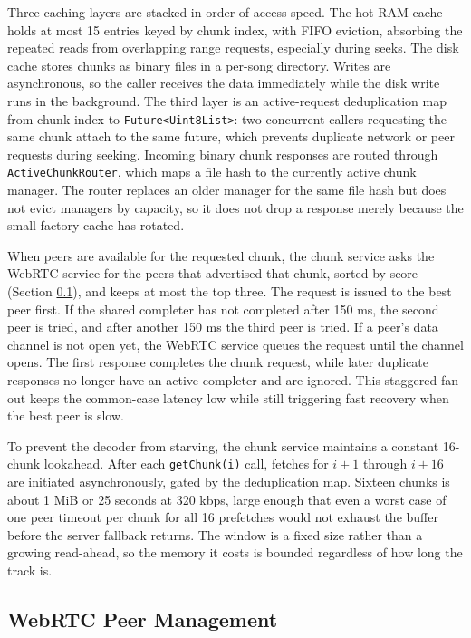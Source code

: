 \indent \par Three caching layers are stacked in order of access speed. The hot RAM cache holds at most 15 entries keyed by chunk index, with FIFO eviction, absorbing the repeated reads from overlapping range requests, especially during seeks. The disk cache stores chunks as binary files in a per-song directory. Writes are asynchronous, so the caller receives the data immediately while the disk write runs in the background. The third layer is an active-request deduplication map from chunk index to \texttt{Future<Uint8List>}: two concurrent callers requesting the same chunk attach to the same future, which prevents duplicate network or peer requests during seeking. Incoming binary chunk responses are routed through \texttt{ActiveChunkRouter}, which maps a file hash to the currently active chunk manager. The router replaces an older manager for the same file hash but does not evict managers by capacity, so it does not drop a response merely because the small factory cache has rotated.

\par When peers are available for the requested chunk, the chunk service asks the WebRTC service for the peers that advertised that chunk, sorted by score (Section \ref{sec:webrtc-client}), and keeps at most the top three. The request is issued to the best peer first. If the shared completer has not completed after 150 ms, the second peer is tried, and after another 150 ms the third peer is tried. If a peer's data channel is not open yet, the WebRTC service queues the request until the channel opens. The first response completes the chunk request, while later duplicate responses no longer have an active completer and are ignored. This staggered fan-out keeps the common-case latency low while still triggering fast recovery when the best peer is slow.

\par To prevent the decoder from starving, the chunk service maintains a constant 16-chunk lookahead. After each \texttt{getChunk(i)} call, fetches for $i+1$ through $i+16$ are initiated asynchronously, gated by the deduplication map. Sixteen chunks is about 1 MiB or 25 seconds at 320 kbps, large enough that even a worst case of one peer timeout per chunk for all 16 prefetches would not exhaust the buffer before the server fallback returns. The window is a fixed size rather than a growing read-ahead, so the memory it costs is bounded regardless of how long the track is.

\subsection{WebRTC Peer Management}
\label{sec:webrtc-client}

